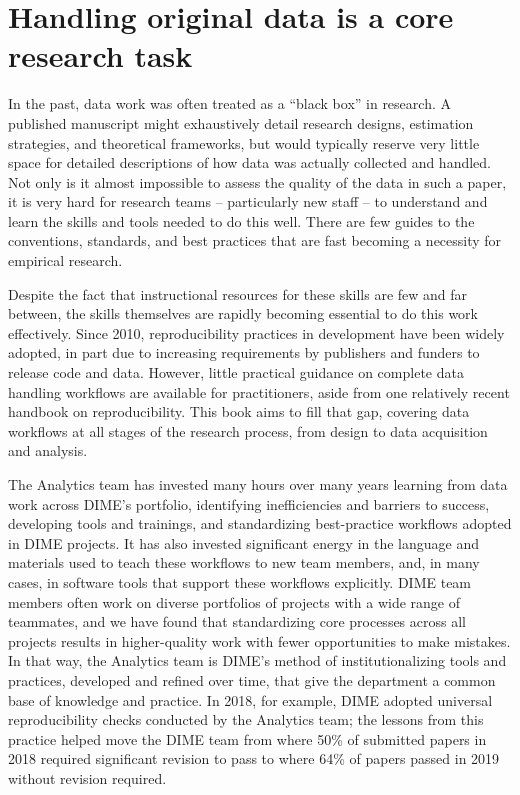 \section{Handling original data is a core research task}

In the past, data work was often treated as a ``black box'' in research.
A published manuscript might exhaustively detail
research designs, estimation strategies, and theoretical frameworks,
but would typically reserve very little space for detailed descriptions
of how data was actually collected and handled.
Not only is it almost impossible to assess the quality of the data in such a paper,
it is very hard for research teams -- particularly new staff --
to understand and learn the skills and tools needed to do this well.
There are few guides to the conventions, standards, and best practices
that are fast becoming a necessity for empirical research.

Despite the fact that instructional resources for these skills are few and far between,
the skills themselves are rapidly becoming essential to do this work effectively.
Since 2010, reproducibility practices in development have been widely adopted,\cite{swanson2020research}
in part due to increasing requirements by publishers and funders to release code and data.
However, little practical guidance on complete data handling workflows are available for practitioners,
aside from one relatively recent handbook on reproducibility.\cite{christensen2019transparent}
This book aims to fill that gap,
covering data workflows at all stages of the research process,
from design to data acquisition and analysis.

The Analytics team has invested many hours over many years
learning from data work across DIME's portfolio,
identifying inefficiencies and barriers to success,
developing tools and trainings, and standardizing best-practice workflows adopted in DIME projects.
It has also invested significant energy in the language and materials
used to teach these workflows to new team members,
and, in many cases, in software tools that support these workflows explicitly.
DIME team members often work on diverse portfolios of projects
with a wide range of teammates, and we have found
that standardizing core processes across all projects
results in higher-quality work with fewer opportunities to make mistakes.
In that way, the Analytics team is DIME's method of institutionalizing
tools and practices, developed and refined over time,
that give the department a common base of knowledge and practice.
In 2018, for example, DIME adopted universal reproducibility checks
conducted by the Analytics team;
the lessons from this practice helped move the DIME team
from where 50\% of submitted papers in 2018
required significant revision to pass
to where 64\% of papers passed in 2019 without revision required.

